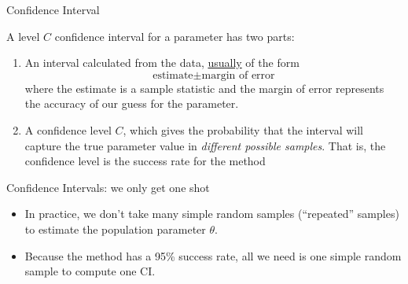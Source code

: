 \documentclass[10pt,handout]{beamer}\usepackage[]{graphicx}\usepackage[]{color}
\begin{document}
\begin{frame}{Confidence Interval}
	
	\begin{definition}
		A level $C$ confidence interval for a parameter has two parts:
		\begin{enumerate}
			\item An interval calculated from the data, \underline{usually} of the form $$\textrm{estimate} \pm \textrm{margin of error}$$ where the estimate is a sample statistic and the margin of error represents the accuracy of our guess for the parameter.
			\item A confidence level $C$, which gives the probability that the interval will capture the true parameter value in \textit{different possible samples}. That is, the confidence level is the success rate for the method
		\end{enumerate}
	\end{definition}
	
	
\end{frame}






\begin{frame}{Confidence Intervals: we only get one shot}
	\begin{itemize}
		\setlength\itemsep{2em}
		\item In practice, we don't take many simple random samples (``repeated'' samples) to estimate the population parameter $\theta$. \pause 
		\item Because the method has a 95\% success rate, all we need is one simple random sample to compute one CI. 
	\end{itemize}
\end{frame}
\end{document}
